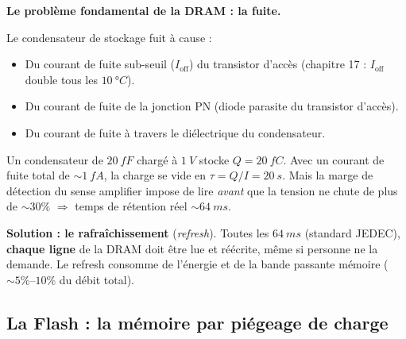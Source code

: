 \documentclass[12pt,a4paper,twoside]{book}
\begin{document}
\begin{attention}
\textbf{Le problème fondamental de la DRAM : la fuite.}

Le condensateur de stockage fuit à cause :
\begin{itemize}[nosep]
\item Du courant de fuite sub-seuil ($I_{\text{off}}$) du transistor d'accès (chapitre 17 : $I_{\text{off}}$ double tous les $\SI{10}{°C}$).
\item Du courant de fuite de la jonction PN (diode parasite du transistor d'accès).
\item Du courant de fuite à travers le diélectrique du condensateur.
\end{itemize}

Un condensateur de $\SI{20}{fF}$ chargé à $\SI{1}{V}$ stocke $Q = \SI{20}{fC}$. Avec un courant de fuite total de $\sim\SI{1}{fA}$, la charge se vide en $\tau = Q/I = \SI{20}{s}$. Mais la marge de détection du sense amplifier impose de lire \textit{avant} que la tension ne chute de plus de $\sim 30\%$ $\Rightarrow$ temps de rétention réel $\sim\SI{64}{ms}$.

\textbf{Solution : le rafraîchissement} (\textit{refresh}). Toutes les $\SI{64}{ms}$ (standard JEDEC), \textbf{chaque ligne} de la DRAM doit être lue et réécrite, même si personne ne la demande. Le refresh consomme de l'énergie et de la bande passante mémoire ($\sim 5\%$--$10\%$ du débit total).
\end{attention}

\subsection{La Flash : la mémoire par piégeage de charge}
\end{document}
